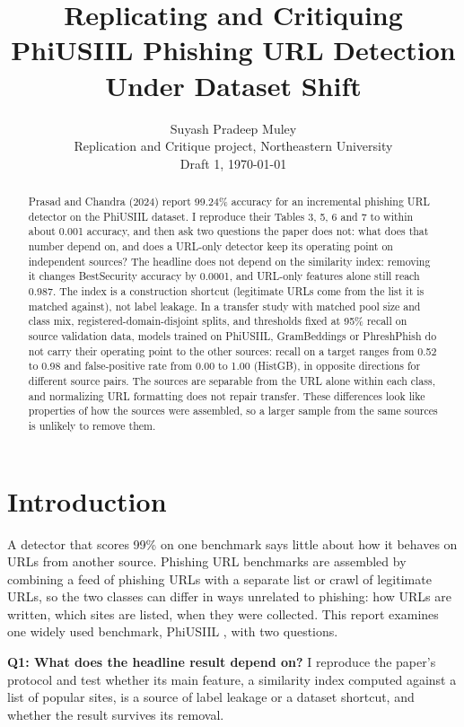 \documentclass[10pt]{article}
\title{Replicating and Critiquing PhiUSIIL Phishing URL Detection\\Under Dataset Shift}
\author{Suyash Pradeep Muley\\Replication and Critique project, Northeastern University\\{\small Draft 1, \today}}
\date{}
\begin{document}
\maketitle

\begin{abstract}
\noindent
Prasad and Chandra (2024) report 99.24\% accuracy for an incremental phishing URL detector on the PhiUSIIL dataset. I reproduce their Tables 3, 5, 6 and 7 to within about 0.001 accuracy, and then ask two questions the paper does not: what does that number depend on, and does a URL-only detector keep its operating point on independent sources? The headline does not depend on the similarity index: removing it changes BestSecurity accuracy by 0.0001, and URL-only features alone still reach 0.987. The index is a construction shortcut (legitimate URLs come from the list it is matched against), not label leakage. In a transfer study with matched pool size and class mix, registered-domain-disjoint splits, and thresholds fixed at 95\% recall on source validation data, models trained on PhiUSIIL, GramBeddings or PhreshPhish do not carry their operating point to the other sources: recall on a target ranges from 0.52 to 0.98 and false-positive rate from 0.00 to 1.00 (HistGB), in opposite directions for different source pairs. The sources are separable from the URL alone within each class, and normalizing URL formatting does not repair transfer. These differences look like properties of how the sources were assembled, so a larger sample from the same sources is unlikely to remove them.
\end{abstract}

\section{Introduction}
A detector that scores 99\% on one benchmark says little about how it behaves on URLs from another source. Phishing URL benchmarks are assembled by combining a feed of phishing URLs with a separate list or crawl of legitimate URLs, so the two classes can differ in ways unrelated to phishing: how URLs are written, which sites are listed, when they were collected. This report examines one widely used benchmark, PhiUSIIL \cite{prasad2024}, with two questions.

\textbf{Q1: What does the headline result depend on?} I reproduce the paper's protocol and test whether its main feature, a similarity index computed against a list of popular sites, is a source of label leakage or a dataset shortcut, and whether the result survives its removal.
\end{document}
